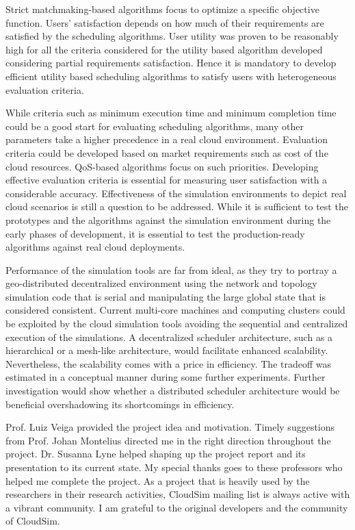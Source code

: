 \documentclass[times, 10pt,twocolumn]{article}
\begin{document}
\balance
Strict matchmaking-based algorithms focus to optimize a specific objective function. Users' satisfaction depends on how much of their requirements are satisfied by the scheduling algorithms. User utility was proven to be reasonably high for all the criteria considered for the utility based algorithm developed considering partial requirements satisfaction. Hence it is mandatory to develop efficient utility based scheduling algorithms to satisfy users with heterogeneous evaluation criteria.

While criteria such as minimum execution time and minimum completion time could be a good start for evaluating scheduling algorithms, many other parameters take a higher precedence in a real cloud environment. Evaluation criteria could be developed based on market requirements such as cost of the cloud resources. QoS-based algorithms focus on such priorities. Developing effective evaluation criteria is essential for measuring user satisfaction with a considerable accuracy. Effectiveness of the simulation environments to depict real cloud scenarios is still a question to be addressed. While it is sufficient to test the prototypes and the algorithms against the simulation environment during the early phases of development, it is essential to test the production-ready algorithms against real cloud deployments.

Performance of the simulation tools are far from ideal, as they try to portray a geo-distributed decentralized environment using the network and topology simulation code that is serial and manipulating the large global state that is  considered consistent. Current multi-core machines and computing clusters could be exploited by the cloud simulation tools avoiding the sequential and centralized execution of the simulations. A decentralized scheduler architecture, such as a hierarchical or a mesh-like architecture, would facilitate enhanced scalability. Nevertheless, the scalability comes with a price in efficiency. The tradeoff was estimated in a conceptual manner during some further experiments. Further investigation would show whether a distributed scheduler architecture would be beneficial overshadowing its shortcomings in efficiency.

Prof. Luiz Veiga provided the project idea and motivation. Timely suggestions from Prof. Johan Montelius directed me in the right direction throughout the project. Dr. Susanna Lyne helped shaping up the project report and its presentation to its current state. My special thanks goes to these professors who helped me complete the project. As a project that is heavily used by the researchers in their research activities, CloudSim mailing list is always active with a vibrant community. I am grateful to the original developers and the community of CloudSim.
\end{document}
